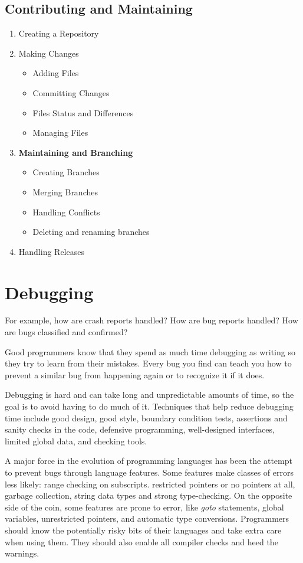\documentclass[draftclsnofoot,journal,onecolumn,12pt]{IEEEtran}
\begin{document}
\subsection{Contributing and Maintaining}

\begin{enumerate}
  \item Creating a Repository
  \item Making Changes
  \begin{itemize}
    \item Adding Files
    \item Committing Changes
    \item Files Status and Differences
    \item Managing Files
  \end{itemize}
  \item \textbf{Maintaining and Branching}
  \begin{itemize}
    \item Creating Branches
    \item Merging Branches
    \item Handling Conflicts
    \item Deleting and renaming branches
\end{itemize}
  \item Handling Releases
\end{enumerate}

\section{Debugging}

For example, how are crash reports handled? How are bug reports handled? How are bugs classified and confirmed?

Good programmers know that they spend as much time debugging as writing so they try to learn from their mistakes. Every bug you find can teach you how to prevent a similar bug from happening again or to recognize it if it does.

Debugging is hard and can take long and unpredictable amounts of time, so the goal is to avoid having to do much of it. Techniques that help reduce debugging time include good design, good style, boundary condition tests, assertions and sanity checks in the code, defensive programming, well-designed interfaces, limited global data, and checking tools.

A major force in the evolution of programming languages has been the attempt to prevent bugs through language features. Some features make classes of errors less likely: range checking on subscripts. restricted pointers or no pointers at all, garbage collection, string data types and strong type-checking. On the opposite side of the coin, some features are prone to error, like \textit{goto} statements, global variables, unrestricted pointers, and automatic type conversions. Programmers should know the potentially risky bits of their languages and take extra care when using them. They should also enable all compiler checks and heed the warnings.
\end{document}
